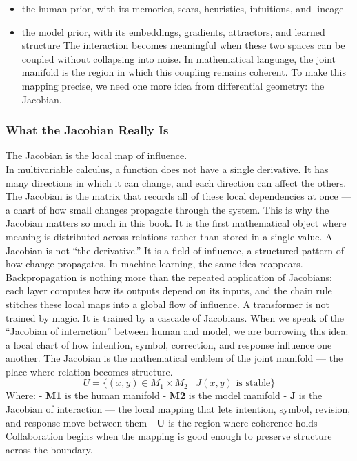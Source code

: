 \begin{itemize}
\tightlist
\item
  the human prior, with its memories, scars, heuristics, intuitions, and
  lineage
\item
  the model prior, with its embeddings, gradients, attractors, and
  learned structure The interaction becomes meaningful when these two
  spaces can be coupled without collapsing into noise. In mathematical
  language, the joint manifold is the region in which this coupling
  remains coherent. To make this mapping precise, we need one more idea
  from differential geometry: the Jacobian.
\end{itemize}

\hypertarget{what-the-jacobian-really-is}{%
\subsubsection{What the Jacobian Really
Is}\label{what-the-jacobian-really-is}}

The Jacobian is the local map of influence.\\
In multivariable calculus, a function does not have a single derivative.
It has many directions in which it can change, and each direction can
affect the others. The Jacobian is the matrix that records all of these
local dependencies at once --- a chart of how small changes propagate
through the system. This is why the Jacobian matters so much in this
book. It is the first mathematical object where meaning is distributed
across relations rather than stored in a single value. A Jacobian is not
``the derivative.'' It is a field of influence, a structured pattern of
how change propagates. In machine learning, the same idea reappears.
Backpropagation is nothing more than the repeated application of
Jacobians: each layer computes how its outputs depend on its inputs, and
the chain rule stitches these local maps into a global flow of
influence. A transformer is not trained by magic. It is trained by a
cascade of Jacobians. When we speak of the ``Jacobian of interaction''
between human and model, we are borrowing this idea: a local chart of
how intention, symbol, correction, and response influence one another.
The Jacobian is the mathematical emblem of the joint manifold --- the
place where relation becomes structure. \[
U = \{ (x, y) \in M_1 \times M_2 \mid J(x, y) \text{ is stable} \}
\] Where: - \textbf{M1} is the human manifold - \textbf{M2} is the model
manifold - \textbf{J} is the Jacobian of interaction --- the local
mapping that lets intention, symbol, revision, and response move between
them - \textbf{U} is the region where coherence holds Collaboration
begins when the mapping is good enough to preserve structure across the
boundary.

